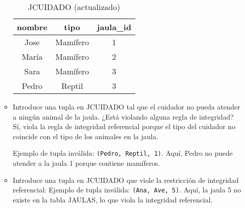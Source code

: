 \begin{enumerate}
\begin{itemize}
        \begin{table}[h!]
        \centering
        \caption{JCUIDADO (actualizado)}
        \begin{tabular}{|c|c|c|}
        \hline
        \textbf{nombre} & \textbf{tipo} & \textbf{jaula\_id} \\ \hline
        Jose           & Mamífero      & 1                  \\ \hline
        María          & Mamífero      & 2                  \\ \hline
        Sara           & Mamífero      & 3                  \\ \hline
        Pedro          & Reptil        & 3                  \\ \hline
        \end{tabular}
        \end{table}

        \item Introduce una tupla en JCUIDADO tal que el cuidador no pueda atender a ningún animal de la jaula. ¿Está violando alguna regla de integridad?  
        Sí, viola la regla de integridad referencial porque el tipo del cuidador no coincide con el tipo de los animales en la jaula.

        Ejemplo de tupla inválida:  
        \texttt{(Pedro, Reptil, 1)}.  
        Aquí, Pedro no puede atender a la jaula 1 porque contiene mamíferos.

        \item Introduce una tupla en JCUIDADO que viole la restricción de integridad referencial:  
        Ejemplo de tupla inválida:  
        \texttt{(Ana, Ave, 5)}.  
        Aquí, la jaula 5 no existe en la tabla JAULAS, lo que viola la integridad referencial.
    \end{itemize}
\end{enumerate}
